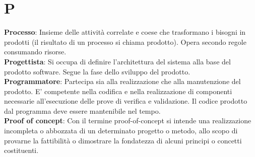 \section*{P}
\textbf{Processo}: Insieme delle attività correlate e coese che trasformano i bisogni in prodotti (il risultato di un processo si
chiama prodotto). Opera secondo regole consumando risorse.\\
\textbf{Progettista}: Si occupa di definire l'architettura del sistema alla base del prodotto software. Segue la fase dello sviluppo del prodotto.\\
\textbf{Programmatore}: Partecipa sia alla realizzazione che alla manutenzione del prodotto. E' competente nella codifica e nella realizzazione di componenti necessarie all’esecuzione delle prove di verifica e validazione. Il codice prodotto dal
programma deve essere mantenibile nel tempo.\\
\textbf{Proof of concept}: Con il termine proof-of-concept si intende una realizzazione incompleta o abbozzata di un determinato progetto o metodo, allo scopo di provarne la fattibilità o dimostrare la fondatezza di alcuni principi o concetti costituenti.\\
